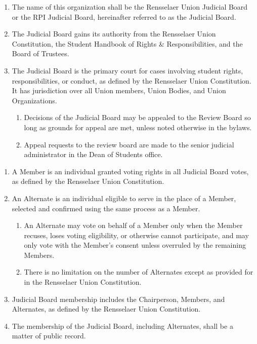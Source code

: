 

\begin{enumerate}
\item 	The name of this organization shall be the Rensselaer Union Judicial Board or the RPI Judicial Board, hereinafter referred to as the Judicial Board. 
\item The Judicial Board gains its authority from the Rensselaer Union Constitution, the Student Handbook of Rights \& Responsibilities, and the Board of Trustees. 
\item  The Judicial Board is the primary court for cases involving student rights, responsibilities, or conduct, as defined by the Rensselaer Union Constitution. It has jurisdiction over all Union members, Union Bodies, and Union Organizations.
\begin{enumerate}
    \item Decisions of the Judicial Board may be appealed to the Review Board so long as grounds for appeal are met, unless noted otherwise in the bylaws.
    \item Appeal requests to the review board are made to the senior judicial administrator in the Dean of Students office. 
\end{enumerate}
\end{enumerate}


\begin{enumerate}
\item A Member is an individual granted voting rights in all Judicial Board votes, as defined by the Rensselaer Union Constitution. 
\item An Alternate is an individual eligible to serve in the place of a Member, selected and confirmed using the same process as a Member.
\begin{enumerate}
    \item An Alternate may vote on behalf of a Member only when the Member recuses, loses voting eligibility, or otherwise cannot participate, and may only vote with the Member’s consent unless overruled by the remaining Members. 
    \item There is no limitation on the number of Alternates except as provided for in the Rensselaer Union Constitution. 
\end{enumerate}
\item Judicial Board membership includes the Chairperson, Members, and Alternates, as defined by the Rensselaer Union Constitution.
\item The membership of the Judicial Board, including Alternates, shall be a matter of public record. 
\end{enumerate}

